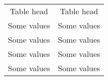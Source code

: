 \documentclass{article}
\begin{document}
\vspace*{\fill} \vspace*{-5ex}

\begin{tabular}{cc}
    \rowcolor{gray!50}
    Table head & Table head\\
    Some values & Some values\\
    Some values & Some values\\
    Some values & Some values\\
    Some values & Some values\\
\end{tabular}

\vspace*{\fill}
\end{document}
